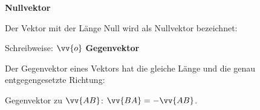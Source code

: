 \begin{tcolorbox}[sidebyside, height=5cm]
	\textbf{Nullvektor}
	
	\textcolor{loestc}{Der Vektor mit der Länge Null wird als Nullvektor bezeichnet:}
	
	\textcolor{loestc}{Schreibweise: \(\vv{o}\)}
	\tcblower
	\textbf{Gegenvektor}
	
	\textcolor{loestc}{Der Gegenvektor eines Vektors hat die gleiche Länge und die genau entgegengesetzte Richtung:}
	
	\textcolor{loestc}{Gegenvektor zu \(\vv{AB}\): \(\vv{BA}=-\vv{AB}\).}
\end{tcolorbox}
